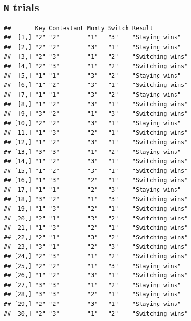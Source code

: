 \documentclass[
]{article}
\newenvironment{Shaded}{\begin{snugshade}}{\end{snugshade}}
\newcommand{\DecValTok}[1]{\textcolor[rgb]{0.00,0.00,0.81}{#1}}
\newcommand{\KeywordTok}[1]{\textcolor[rgb]{0.13,0.29,0.53}{\textbf{#1}}}
\newcommand{\NormalTok}[1]{#1}
\newcommand{\OperatorTok}[1]{\textcolor[rgb]{0.81,0.36,0.00}{\textbf{#1}}}
\newcommand{\StringTok}[1]{\textcolor[rgb]{0.31,0.60,0.02}{#1}}
\begin{document}
\hypertarget{n-trials}{%
\subsection{\texorpdfstring{\texttt{N}
trials}{N trials}}\label{n-trials}}

\begin{Shaded}
\end{Shaded}

\begin{verbatim}
##       Key Contestant Monty Switch Result          
##  [1,] "2" "2"        "1"   "3"    "Staying wins"  
##  [2,] "2" "2"        "3"   "1"    "Staying wins"  
##  [3,] "2" "3"        "1"   "2"    "Switching wins"
##  [4,] "2" "3"        "1"   "2"    "Switching wins"
##  [5,] "1" "1"        "3"   "2"    "Staying wins"  
##  [6,] "1" "2"        "3"   "1"    "Switching wins"
##  [7,] "1" "1"        "3"   "2"    "Staying wins"  
##  [8,] "1" "2"        "3"   "1"    "Switching wins"
##  [9,] "3" "2"        "1"   "3"    "Switching wins"
## [10,] "2" "2"        "3"   "1"    "Staying wins"  
## [11,] "1" "3"        "2"   "1"    "Switching wins"
## [12,] "1" "2"        "3"   "1"    "Switching wins"
## [13,] "3" "3"        "1"   "2"    "Staying wins"  
## [14,] "1" "2"        "3"   "1"    "Switching wins"
## [15,] "1" "2"        "3"   "1"    "Switching wins"
## [16,] "1" "3"        "2"   "1"    "Switching wins"
## [17,] "1" "1"        "2"   "3"    "Staying wins"  
## [18,] "3" "2"        "1"   "3"    "Switching wins"
## [19,] "1" "3"        "2"   "1"    "Switching wins"
## [20,] "2" "1"        "3"   "2"    "Switching wins"
## [21,] "1" "3"        "2"   "1"    "Switching wins"
## [22,] "2" "1"        "3"   "2"    "Switching wins"
## [23,] "3" "1"        "2"   "3"    "Switching wins"
## [24,] "2" "3"        "1"   "2"    "Switching wins"
## [25,] "2" "2"        "1"   "3"    "Staying wins"  
## [26,] "1" "2"        "3"   "1"    "Switching wins"
## [27,] "3" "3"        "1"   "2"    "Staying wins"  
## [28,] "3" "3"        "2"   "1"    "Staying wins"  
## [29,] "2" "2"        "3"   "1"    "Staying wins"  
## [30,] "2" "3"        "1"   "2"    "Switching wins"
\end{verbatim}
\end{document}
